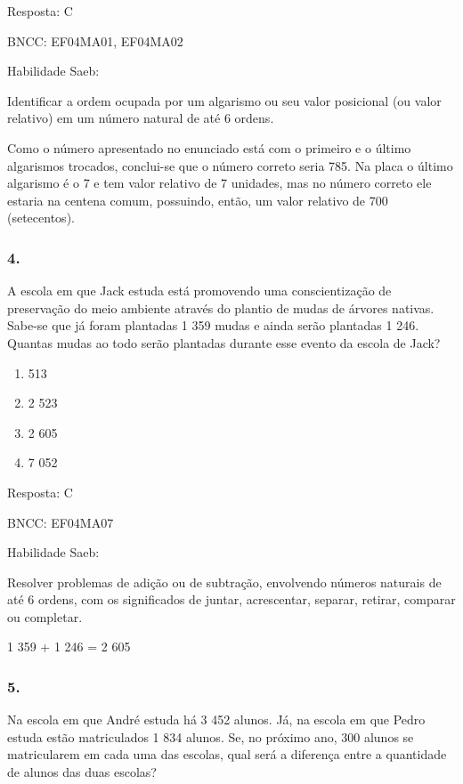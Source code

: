 Resposta: C

BNCC: EF04MA01, EF04MA02

Habilidade Saeb:

Identificar a ordem ocupada por um algarismo ou seu valor posicional (ou
valor relativo) em um número natural de até 6 ordens.

Como o número apresentado no enunciado está com o primeiro e o último
algarismos trocados, conclui-se que o número correto seria 785. Na placa
o último algarismo é o 7 e tem valor relativo de 7 unidades, mas no
número correto ele estaria na centena comum, possuindo, então, um valor
relativo de 700 (setecentos).

\subsubsection{4.}\label{section-146}

A escola em que Jack estuda está promovendo uma conscientização de
preservação do meio ambiente através do plantio de mudas de árvores
nativas. Sabe-se que já foram plantadas 1 359 mudas e ainda serão
plantadas 1 246. Quantas mudas ao todo serão plantadas durante esse
evento da escola de Jack?

\begin{enumerate}
\def\labelenumi{\alph{enumi})}
\item
  513
\item
  2 523
\item
  2 605
\item
  7 052
\end{enumerate}

Resposta: C

BNCC: EF04MA07

Habilidade Saeb:

Resolver problemas de adição ou de subtração, envolvendo números
naturais de até 6 ordens, com os significados de juntar, acrescentar,
separar, retirar, comparar ou completar.

1 359 + 1 246 = 2 605

\subsubsection{5.}\label{section-147}

Na escola em que André estuda há 3 452 alunos. Já, na escola em que
Pedro estuda estão matriculados 1 834 alunos. Se, no próximo ano, 300
alunos se matricularem em cada uma das escolas, qual será a diferença
entre a quantidade de alunos das duas escolas?

